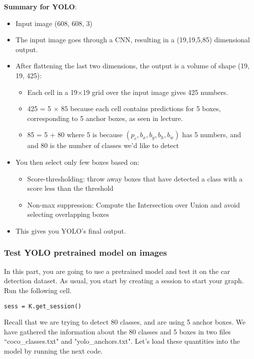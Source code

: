 {\color{red}\textbf{Summary for YOLO}:
\begin{itemize}
\item Input image (608, 608, 3)
\item The input image goes through a CNN, resulting in a (19,19,5,85) dimensional output. 
\item After flattening the last two dimensions, the output is a volume of shape (19, 19, 425):
    \begin{itemize}
    \item Each cell in a 19$\times$19 grid over the input image gives 425 numbers. 
    \item 425 = 5 $\times$ 85 because each cell contains predictions for 5 boxes, corresponding to 5 anchor boxes, as seen in lecture. 
    \item 85 = 5 + 80 where 5 is because $(p_c, b_x, b_y, b_h, b_w)$ has 5 numbers, and and 80 is the number of classes we'd like to detect
    \end{itemize}
\item You then select only few boxes based on:
    \begin{itemize}
    \item Score-thresholding: throw away boxes that have detected a class with a score less than the threshold
    \item Non-max suppression: Compute the Intersection over Union and avoid selecting overlapping boxes
    \end{itemize}
\item This gives you YOLO's final output. 
\end{itemize}
}



\subsubsection{Test YOLO pretrained model on images}

In this part, you are going to use a pretrained model and test it on the car detection dataset. As usual, you start by creating a session to start your graph. Run the following cell.
\begin{verbatim}
sess = K.get_session()
\end{verbatim}



Recall that we are trying to detect 80 classes, and are using 5 anchor boxes. We have gathered the information about the 80 classes and 5 boxes in two files ``coco\_classes.txt" and "yolo\_anchors.txt". Let's load these quantities into the model by running the next code.


